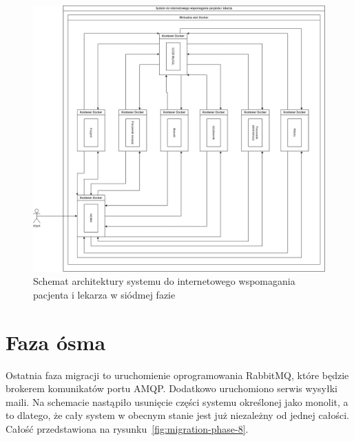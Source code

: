 \documentclass[12pt,oneside]{book}
\newcommand{\captionvspace}{\vspace{6pt}}
\begin{document}
    \begin{figure}[ht]
        \centering
        \includegraphics[width=\textwidth]{includes/images/migration-phase-7.png}
        \captionvspace
        \caption{Schemat architektury systemu do internetowego wspomagania pacjenta i lekarza w siódmej fazie}
        \label{fig:migration-phase-7}
    \end{figure}


    \section{Faza ósma}
    Ostatnia faza migracji to uruchomienie oprogramowania RabbitMQ, które będzie brokerem komunikatów portu AMQP. Dodatkowo uruchomiono serwis wysyłki maili. Na schemacie nastąpiło usunięcie części systemu określonej jako monolit, a to dlatego, że cały system w obecnym stanie jest już niezależny od jednej całości. Całość przedstawiona na rysunku~\ref{fig:migration-phase-8}.
\end{document}

